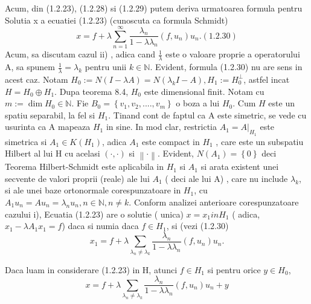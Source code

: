\documentclass[a4paper,12pt,oneside]{report}
\begin{document}
	Acum, din (1.2.23), (1.2.28) si (1.2.29)  putem deriva urmatoarea formula pentru Solutia x a ecuatiei (1.2.23) (cunoscuta ca formula Schmidt)
	\begin{displaymath}
		x = f + \lambda \sum_{n=1}^{\infty }\frac{\lambda_{n}}{1 - \lambda \lambda_{n}}\left ( f, u_{n} \right )u_{n}.(1.2.30)
	\end{displaymath}
	Acum, sa discutam cazul ii) , adica cand \(\frac{1}{\lambda}\) este o valoare proprie a operatorului A, sa spunem \(\frac{1}{\lambda} = \lambda_{k}\) pentru unii \(k \in \mathbb{N}\). Evident, formula (1.2.30) nu are sens in acest caz. 
	Notam \(H_{0}:= N\left ( I - \lambda A \right ) = N \left ( \lambda_{k}I - A \right ), H_{1}:= H_{0}^{\perp }\), astfel incat \(H = H_{0}\oplus H_{1}\). Dupa teorema 8.4, \(H_{0}\) este dimensional finit. Notam cu \(m:= \dim H_{0}\in \mathbb{N}\). Fie \(B_{0} = \left \{ v_{1}, v_{2},....,v_{m} \right \}\) o boza a lui \(H_{0}\). Cum \(H\) este un spatiu separabil, la fel si \(H_{1}\). 
	Tinand cont de faptul ca A este simetric, se vede cu usurinta ca A mapeaza \(H_{1}\) in sine. In mod clar, restrictia \(A_{1} = A|_{H_{1}}\) este simetrica si \(A_{1} \in K\left ( H_{1} \right )\), adica \(A_{1}\) este compact in \(H_{1}\) , care este un subspatiu Hilbert al lui H cu acelasi \(\left ( \cdot ,\cdot  \right )\) si \(\left \| \cdot  \right \|\). Evident, \(N\left ( A_{1} \right ) = \left \{ 0 \right \}\) deci Teorema Hilbert-Schmidt este aplicabila in \(H_{1}\) si \(A_{1}\) si arata existent unei secvente de valori proprii (reale) ale lui \(A_{1}\) ( deci ale lui A) , care nu include \(\lambda _{k}\), si ale unei baze ortonormale corespunzatoare in \(H_{1}\), cu 
	\(A_{1}u_{n} = Au_{n} = \lambda _{n}u_{n}, n\in\mathbb{N}, n\neq k\).
	Conform analizei anterioare corespunzatoare cazului i), Ecuatia (1.2.23) are o solutie ( unica) \(x = x_{1} in H_{1}\) ( adica, \(x_{1} - \lambda A_{1}x_{1} = f\)) daca si numia daca \(f\in H_{1}\), si (vezi (1.2.30)
	\begin{displaymath}
		x_{1} = f + \lambda \sum_{\lambda_{n}\neq \lambda_{k}}\frac{\lambda_{n}}{1 - \lambda \lambda _{n}}\left ( f, u_{n} \right )u_{n}. 
	\end{displaymath}
					
					
	Daca luam in considerare (1.2.23) in H, atunci \(f\in H_{1}\) si pentru orice \(y\in H_{0}\),
	\begin{displaymath}
		x = f+ \lambda \sum_{\lambda_{n}\neq \lambda_{k}}\frac{\lambda_{n}}{1 - \lambda \lambda _{n}}\left ( f, u_{n} \right )u_{n} + y
	\end{displaymath}
					
\end{document}
